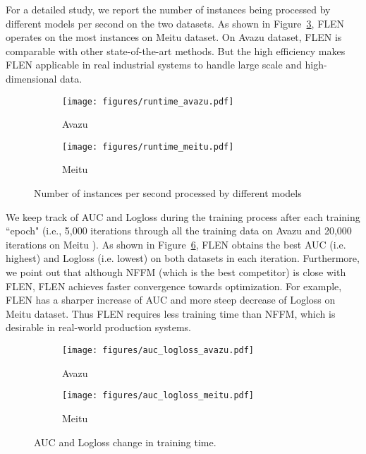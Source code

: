 \documentclass[sigconf]{acmart}
\begin{document}
For a detailed study, we report the number of instances being processed by different models per second on the two datasets.  
As shown in Figure~\ref{fig:runtime}, FLEN operates on the most instances on Meitu dataset. On Avazu dataset, FLEN is comparable with other state-of-the-art methods. 
But the high efficiency makes FLEN applicable in real industrial systems to handle large scale and high-dimensional data.

\begin{figure}[ht]
	\centering
	\begin{subfigure}[b]{\columnwidth}
		\centering
		\texttt{[image: figures/runtime\_avazu.pdf]}
		\caption{Avazu}
		\label{fig:runtimeavazu}
	\end{subfigure} \hspace{-7pt}
	\begin{subfigure}[b]{\columnwidth}
		\centering
		\texttt{[image: figures/runtime\_meitu.pdf]}
		\caption{Meitu}
		\label{fig:runtimemeitu}
	\end{subfigure}  \hspace{-7pt}
	\caption{Number of instances per second processed by different models }
	\label{fig:runtime}
\end{figure}

We keep track of AUC and Logloss during the training process after each training ``epoch" (i.e., 5,000 iterations through all the training data on Avazu and 20,000 iterations on Meitu ).
As shown in Figure~\ref{fig:converge}, FLEN obtains the best AUC (i.e. highest) and Logloss (i.e. lowest) on both datasets in each iteration. 
Furthermore, we point out that although NFFM (which is the best competitor) is close with FLEN, FLEN achieves faster convergence towards optimization. For example, FLEN has a sharper increase of AUC and more steep decrease of Logloss on Meitu dataset. 
Thus FLEN requires less training time than NFFM, which is desirable in real-world production systems. 

\begin{figure}[htbp]
	\centering
	\begin{subfigure}[b]{\columnwidth}
		\centering
		\texttt{[image: figures/auc\_logloss\_avazu.pdf]}
		\caption{Avazu}
		\label{fig:convergeavazu}
	\end{subfigure} \hspace{-7pt}
	
	\begin{subfigure}[b]{\columnwidth}
		\centering
		\texttt{[image: figures/auc\_logloss\_meitu.pdf]}
		\caption{Meitu}
		\label{fig:convergemeitu}
	\end{subfigure}  \hspace{-7pt}
	\caption{AUC and Logloss change in training time.}
	\label{fig:converge}
\end{figure}
\end{document}
